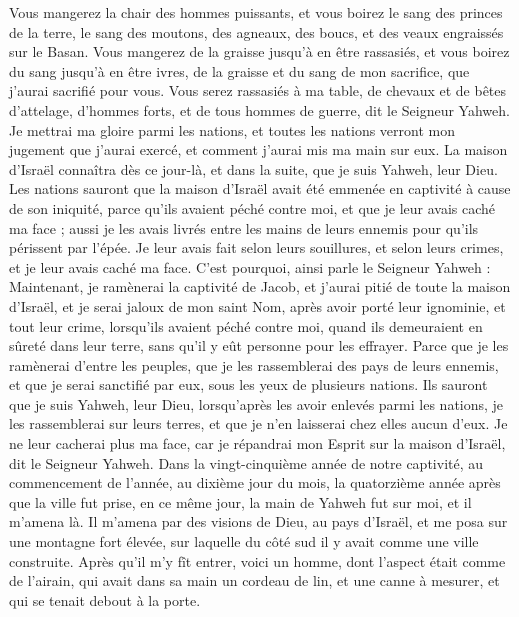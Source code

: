 \begin{multicols}{2}
Vous mangerez la chair des hommes puissants, et vous boirez le sang des princes de la terre, le sang des moutons, des agneaux, des boucs, et des veaux engraissés sur le Basan\FTNT{}.
Vous mangerez de la graisse jusqu’à en être rassasiés, et vous boirez du sang jusqu'à en être ivres, de la graisse et du sang de mon sacrifice, que j'aurai sacrifié pour vous.
Vous serez rassasiés à ma table, de chevaux et de bêtes d'attelage, d'hommes forts, et de tous hommes de guerre, dit le Seigneur Yahweh.
Je mettrai ma gloire parmi les nations, et toutes les nations verront mon jugement que j'aurai exercé, et comment j'aurai mis ma main sur eux.
La maison d'Israël connaîtra dès ce jour-là, et dans la suite, que je suis Yahweh, leur Dieu.
Les nations sauront que la maison d'Israël avait été emmenée en captivité à cause de son iniquité, parce qu'ils avaient péché contre moi, et que je leur avais caché ma face ; aussi je les avais livrés entre les mains de leurs ennemis pour qu’ils périssent par l'épée\FTNT{}.
Je leur avais fait selon leurs souillures, et selon leurs crimes, et je leur avais caché ma face.
C'est pourquoi, ainsi parle le Seigneur Yahweh : Maintenant, je ramènerai la captivité de Jacob, et j'aurai pitié de toute la maison d'Israël, et je serai jaloux de mon saint Nom,
après avoir porté leur ignominie, et tout leur crime, lorsqu’ils avaient péché contre moi, quand ils demeuraient en sûreté dans leur terre, sans qu'il y eût personne pour les effrayer.
Parce que je les ramènerai d'entre les peuples, que je les rassemblerai des pays de leurs ennemis, et que je serai sanctifié par eux, sous les yeux de plusieurs nations.
Ils sauront que je suis Yahweh, leur Dieu, lorsqu'après les avoir enlevés parmi les nations, je les rassemblerai sur leurs terres, et que je n'en laisserai chez elles aucun d’eux.
Je ne leur cacherai plus ma face, car je répandrai mon Esprit sur la maison d'Israël, dit le Seigneur Yahweh\FTNT{}.
\VerseOne{}Dans la vingt-cinquième année de notre captivité, au commencement de l'année, au dixième jour du mois, la quatorzième année après que la ville fut prise, en ce même jour, la main de Yahweh fut sur moi, et il m'amena là.
Il m'amena par des visions de Dieu, au pays d'Israël, et me posa sur une montagne fort élevée, sur laquelle du côté sud il y avait comme une ville construite.
Après qu'il m'y fît entrer, voici un homme, dont l’aspect était comme de l'airain, qui avait dans sa main un cordeau de lin, et une canne à mesurer, et qui se tenait debout à la porte.

\end{multicols}
